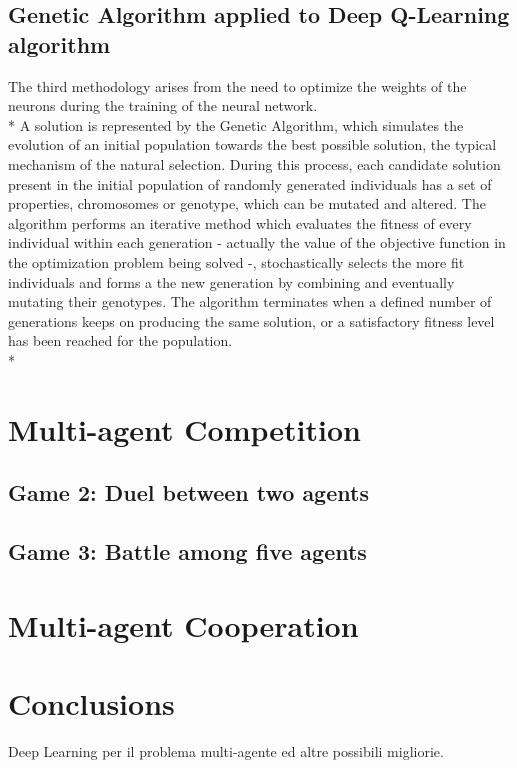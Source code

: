 \subsection{Genetic Algorithm applied to Deep Q-Learning algorithm}
The third methodology arises from the need to optimize the weights of the neurons during the training of the neural network.\\*
A solution is represented by the Genetic Algorithm, which simulates the evolution of an initial population towards the best possible solution, the typical mechanism of the natural selection. During this process, each candidate solution present in the initial population of randomly generated individuals has a set of properties, chromosomes or genotype, which can be mutated and altered. The algorithm performs an iterative method which evaluates the fitness of every individual within each generation - actually the value of the objective function in the optimization problem being solved -, stochastically selects  the more fit individuals and forms a the new generation by combining and eventually mutating their genotypes. The algorithm terminates when a defined number of generations keeps on producing the same solution, or a satisfactory fitness level has been reached for the population.\\*

\newpage

\section{Multi-agent Competition}
\subsection{Game 2: Duel between two agents}
\subsection{Game 3: Battle among five agents}

\section{Multi-agent Cooperation}

\section{Conclusions}
Deep Learning per il problema multi-agente ed altre possibili migliorie.





